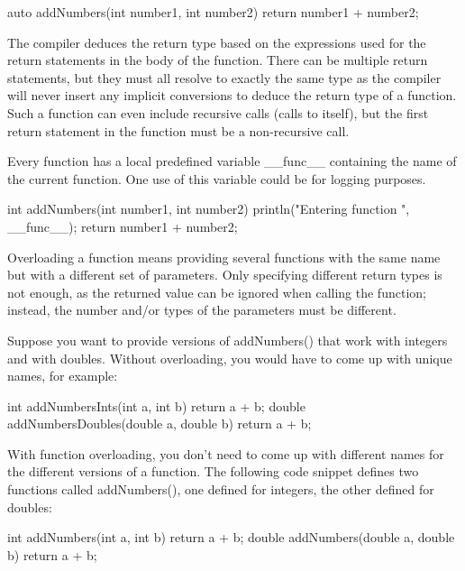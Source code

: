 \begin{cpp}
auto addNumbers(int number1, int number2)
{
    return number1 + number2;
}
\end{cpp}

The compiler deduces the return type based on the expressions used for the return statements in the body of the function. There can be multiple return statements, but they must all resolve to exactly the same type as the compiler will never insert any implicit conversions to deduce the return type of a function. Such a function can even include recursive calls (calls to itself), but the first return statement in the function must be a non-recursive call.


Every function has a local predefined variable \_\_func\_\_ containing the name of the current function. One use of this variable could be for logging purposes.

\begin{cpp}
int addNumbers(int number1, int number2)
{
    println("Entering function {}", __func__);
    return number1 + number2;
}
\end{cpp}


Overloading a function means providing several functions with the same name but with a different set of parameters. Only specifying different return types is not enough, as the returned value can be ignored when calling the function; instead, the number and/or types of the parameters must be different.

Suppose you want to provide versions of addNumbers() that work with integers and with doubles. Without overloading, you would have to come up with unique names, for example:

\begin{cpp}
int addNumbersInts(int a, int b) { return a + b; }
double addNumbersDoubles(double a, double b) { return a + b; }
\end{cpp}

With function overloading, you don’t need to come up with different names for the different versions of a function. The following code snippet defines two functions called addNumbers(), one defined for integers, the other defined for doubles:

\begin{cpp}
int addNumbers(int a, int b) { return a + b; }
double addNumbers(double a, double b) { return a + b; }
\end{cpp}

